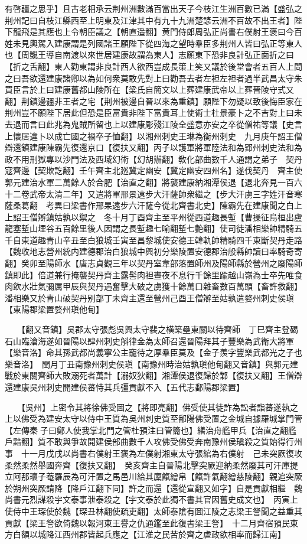 有啓疆之思乎】且古老相承云荆州洲數滿百當出天子今枝江生洲百數已滿【盛弘之荆州記曰自枝江縣西至上明東及江津其中有九十九洲楚諺云洲不百故不出王者】陛下龍飛是其應也上令朝臣議之【朝直遥翻】黄門侍郎周弘正尚書右僕射王褒曰今百姓未見輿駕入建康謂是列國諸王願陛下從四海之望時羣臣多荆州人皆曰弘正等東人也【周覬王導自南渡以來世居建康故謂為東人】志願東下恐非良計弘正面折之曰【折之舌翻】東人勸東謂非良計西人欲西豈成長策上笑又議於後堂會者五百人上問之曰吾欲還建康諸卿以為如何衆莫敢先對上曰勸吾去者左袒左袒者過半武昌太守朱買臣言於上曰建康舊都山陵所在【梁氏自簡文以上葬建康武帝以上葬晉陵守式又翻】荆鎮邊疆非王者之宅【荆州被邊自晉以來為重鎮】願陛下勿疑以致後悔臣家在荆州豈不願陛下居此但恐是臣富貴非陛下富貴耳上使術士杜景豪卜之不吉對上曰未去退而言曰此兆為鬼賊所留也上以建康彫殘江陵全盛意亦安之卒從僧祐等議【史言上懷居違卜以成亡國之禍卒子恤翻】以湘州刺史王琳為衡州刺史　九月庚午詔王僧辯還鎮建康陳霸先復還京口【復扶又翻】丙子以護軍將軍陸法和為郢州刺史法和為政不用刑獄專以沙門法及西域幻術【幻胡辦翻】敎化部曲數千人通謂之弟子　契丹寇齊邊【契欺訖翻】壬午齊主北廵冀定幽安【冀定幽安四州名】遂伐契丹　齊主使郭元建治水軍二萬餘人於合肥【治直之翻】將襲建康納湘潭侯退【退北奔見一百六十二卷武帝太清二年】又遣將軍邢景遠步大汗薩帥衆繼之【步大汗虜三字姓汗音寒薩桑葛翻　考異曰梁書作邢杲遠步六汗薩今從北齊書北史】陳霸先在建康聞之白上上詔王僧辯鎮姑孰以禦之　冬十月丁酉齊主至平州從西道趣長塹【曹操征烏桓出盧龍塞塹山堙谷五百餘里後人因謂之長塹趣七喻翻塹七艶翻】使司徒潘相樂帥精騎五千自東道趣青山辛丑至白狼城壬寅至昌黎城使安德王韓軌帥精騎四千東斷契丹走路【魏收地志營州統内建德郡治白狼城中興初分樂陵置安德郡治般縣帥讀曰率騎奇寄翻】癸卯至陽師水【唐志貞觀三年以契丹室韋部落置師州及陽師縣於營州之廢陽師鎮即此】倍道兼行掩襲契丹齊主露髻肉袒晝夜不息行千餘里踰越山嶺為士卒先唯食肉飲水壯氣彌厲甲辰與契丹遇奮擊大破之虜獲十餘萬口雜畜數百萬頭【畜許救翻】潘相樂又於青山破契丹别部丁未齊主還至營州己酉王僧辯至姑孰遣婺州刺史侯瑱【東陽郡梁置婺州瑱他甸】

　　【翻又音鎮】吳郡太守張彪吳興太守裴之横築壘東關以待齊師　丁巳齊主登碣石山臨滄海遂如晉陽以肆州刺史斛律金為太師召還晉陽拜其子豐樂為武衛大將軍【樂音洛】命其孫武都尚義寧公主寵待之厚羣臣莫及【金子羨字豐樂武都光之子也樂音洛】　閏月丁丑南豫州刺史侯瑱【南豫州時治姑孰瑱他甸翻又音鎮】與郭元建戰於東關齊師大敗溺死者萬計【溺奴狄翻】湘潭侯退復歸於鄴【復扶又翻】王僧辯還建康吳州刺史開建侯蕃恃其兵彊貢獻不入【五代志鄱陽郡梁置】

　　【吳州】上密令其將徐佛受圖之【將即亮翻】佛受使其徒詐為訟者詣蕃遂執之上以佛受為建安太守以侍中王質為吳州刺史質至鄱陽佛受置之金城自據羅城掌門管【左傳秦子曰鄭人使我掌北門之管杜預注曰管籥也】繕治舟艦甲兵【治直之翻艦戶黯翻】質不敢與爭故開建侯部曲數千人攻佛受佛受奔南豫州侯瑱殺之質始得行州事　十一月戊戌以尚書右僕射王褒為左僕射湘東太守張綰為右僕射　己未突厥復攻柔然柔然舉國奔齊【復扶又翻】　癸亥齊主自晉陽北擊突厥迎納柔然廢其可汗庫提立阿那瓌子菴羅辰為可汗置之馬邑川給其廩餼繒帛【餼許氣翻繒慈陵翻】親追突厥於朔州突厥請降【降戶江翻下同】許之而還【還從宣翻又如字】自是貢獻相繼　魏尚書元烈謀殺宇文泰事泄泰殺之【宇文泰於此獨不書其官因舊史成文也】　丙寅上使侍中王琛使於魏【琛丑林翻使疏吏翻】太師泰隂有圖江陵之志梁王詧聞之益重其貢獻【梁王詧欲倚魏以報河東王譽之仇通鑑至此復書梁王詧】　十二月齊宿預民東方白額以城降江西州郡皆起兵應之【江淮之民苦於齊之虐政欲相率而歸江南】

